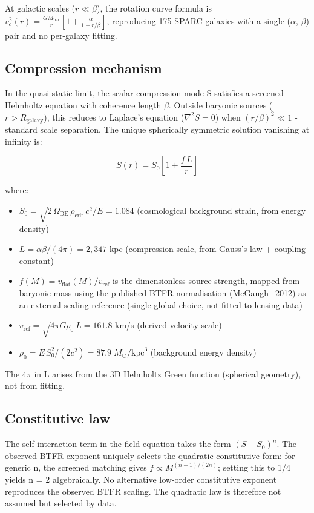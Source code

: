 \documentclass[11pt,a4paper]{article}
\begin{document}
At galactic scales (\(r \ll \beta\)), the rotation curve formula is \(v_c^2(r) = \frac{GM_{\mathrm{bar}}}{r}\left[1 + \frac{\alpha}{1 + r/\beta}\right]\), reproducing 175 SPARC galaxies with a single ($\alpha$, $\beta$) pair and no per-galaxy fitting.

\subsection{Compression mechanism}
In the quasi-static limit, the scalar compression mode S satisfies a screened Helmholtz equation with coherence length $\beta$. Outside baryonic sources (\(r > R_{\mathrm{galaxy}}\)), this reduces to Laplace's equation (\(\nabla^2 S = 0\)) when \((r/\beta)^2 \ll 1\)  -  standard scale separation. The unique spherically symmetric solution vanishing at infinity is:

\[ S(r) = S_0\left[1 + \frac{f\,L}{r}\right] \]

where:

\begin{itemize}
  \item \(S_0 = \sqrt{2\,\Omega_{\mathrm{DE}}\,\rho_{\mathrm{crit}}\,c^2 / E} = 1.084\) (cosmological background strain, from energy density)
  \item \(L = \alpha\beta / (4\pi) = 2{,}347\) kpc (compression scale, from Gauss's law + coupling constant)
  \item \(f(M) = v_{\mathrm{flat}}(M) / v_{\mathrm{ref}}\) is the dimensionless source strength, mapped from baryonic mass using the published BTFR normalisation (McGaugh+2012) as an external scaling reference (single global choice, not fitted to lensing data)
  \item \(v_{\mathrm{ref}} = \sqrt{4\pi G\rho_0}\,L = 161.8\) km/\allowbreak{}s (derived velocity scale)
  \item \(\rho_0 = E\,S_0^2 / (2c^2) = 87.9\;M_\odot/\mathrm{kpc}^3\) (background energy density)
\end{itemize}

The 4$\pi$ in L arises from the 3D Helmholtz Green function (spherical geometry), not from fitting.

\subsection{Constitutive law}
The self-interaction term in the field equation takes the form \((S - S_0)^n\). The observed BTFR exponent uniquely selects the quadratic constitutive form: for generic n, the screened matching gives \(f \propto M^{(n-1)/(2n)}\); setting this to 1/\allowbreak{}4 yields n = 2 algebraically. No alternative low-order constitutive exponent reproduces the observed BTFR scaling. The quadratic law is therefore not assumed but selected by data.
\end{document}
